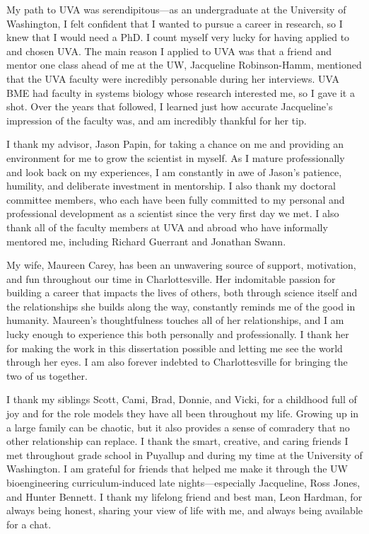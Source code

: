 \documentclass[11pt,twocolumn,notitlepage,openany,twoside]{book}
\begin{document}
My path to UVA was serendipitous---as an undergraduate at the University of Washington, I felt confident that I wanted to pursue a career in research, so I knew that I would need a PhD. I count myself very lucky for having applied to and chosen UVA. The main reason I applied to UVA was that a friend and mentor one class ahead of me at the UW, Jacqueline Robinson-Hamm, mentioned that the UVA faculty were incredibly personable during her interviews. UVA BME had faculty in systems biology whose research interested me, so I gave it a shot. Over the years that followed, I learned just how accurate Jacqueline's impression of the faculty was, and am incredibly thankful for her tip.

I thank my advisor, Jason Papin, for taking a chance on me and providing an environment for me to grow the scientist in myself. As I mature professionally and look back on my experiences, I am constantly in awe of Jason's patience, humility, and deliberate investment in mentorship. I also thank my doctoral committee members, who each have been fully committed to my personal and professional development as a scientist since the very first day we met. I also thank all of the faculty members at UVA and abroad who have informally mentored me, including Richard Guerrant and Jonathan Swann.

My wife, Maureen Carey, has been an unwavering source of support, motivation, and fun throughout our time in Charlottesville. Her indomitable passion for building a career that impacts the lives of others, both through science itself and the relationships she builds along the way, constantly reminds me of the good in humanity. Maureen's thoughtfulness touches all of her relationships, and I am lucky enough to experience this both personally and professionally. I thank her for making the work in this dissertation possible and letting me see the world through her eyes. I am also forever indebted to Charlottesville for bringing the two of us together.

I thank my siblings Scott, Cami, Brad, Donnie, and Vicki, for a childhood full of joy and for the role models they have all been throughout my life. Growing up in a large family can be chaotic, but it also provides a sense of comradery that no other relationship can replace. I thank the smart, creative, and caring friends I met throughout grade school in Puyallup and during my time at the University of Washington. I am grateful for friends that helped me make it through the UW bioengineering curriculum-induced late nights---especially Jacqueline, Ross Jones, and Hunter Bennett. I thank my lifelong friend and best man, Leon Hardman, for always being honest, sharing your view of life with me, and always being available for a chat.
\end{document}
